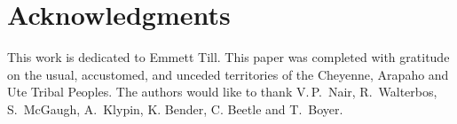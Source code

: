 \documentclass[reprint,%
 amsmath,amssymb,
 aps,
]{revtex4-1}
\begin{document}


   

  \section[]{Acknowledgments}
 This work is dedicated to Emmett Till. This paper was completed with gratitude on the usual, accustomed, and unceded territories
of the Cheyenne, Arapaho and Ute Tribal Peoples.
  The authors would like to thank  V.\,P.\,  Nair,   R.\, Walterbos, S.\ McGaugh, A.\, Klypin, K. Bender, C. Beetle and     T.\, Boyer.   \\
  
 
\end{document}
